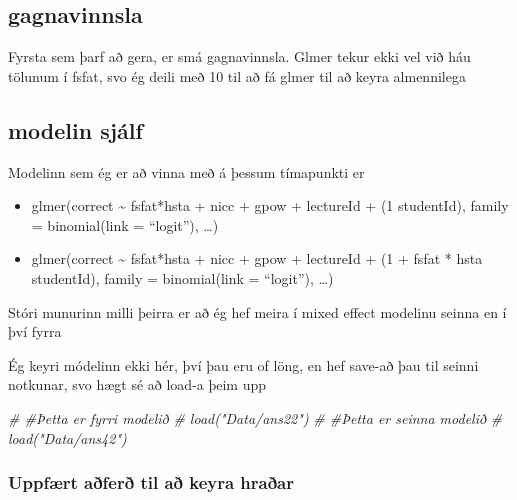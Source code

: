 \documentclass[
]{article}
\newenvironment{Shaded}{\begin{snugshade}}{\end{snugshade}}
\newcommand{\CommentTok}[1]{\textcolor[rgb]{0.56,0.35,0.01}{\textit{#1}}}
\newcommand{\DecValTok}[1]{\textcolor[rgb]{0.00,0.00,0.81}{#1}}
\newcommand{\NormalTok}[1]{#1}
\newcommand{\OperatorTok}[1]{\textcolor[rgb]{0.81,0.36,0.00}{\textbf{#1}}}
\newcommand{\StringTok}[1]{\textcolor[rgb]{0.31,0.60,0.02}{#1}}
\begin{document}
\hypertarget{gagnavinnsla}{%
\subsection{gagnavinnsla}\label{gagnavinnsla}}

Fyrsta sem þarf að gera, er smá gagnavinnsla. Glmer tekur ekki vel við háu tölunum í fsfat, svo ég deili með 10 til að fá glmer til að keyra almennilega

\begin{Shaded}
\end{Shaded}

\hypertarget{modelin-sjuxe1lf}{%
\subsection{modelin sjálf}\label{modelin-sjuxe1lf}}

Modelinn sem ég er að vinna með á þessum tímapunkti er

\begin{itemize}
\item
  glmer(correct \textasciitilde{} fsfat*hsta + nicc + gpow + lectureId + (1 \textbar{} studentId), family = binomial(link = ``logit''), \ldots)
\item
  glmer(correct \textasciitilde{} fsfat*hsta + nicc + gpow + lectureId + (1 + fsfat * hsta \textbar{} studentId), family = binomial(link = ``logit''), \ldots)
\end{itemize}

Stóri munurinn milli þeirra er að ég hef meira í mixed effect modelinu seinna en í því fyrra

Ég keyri módelinn ekki hér, því þau eru of löng, en hef save-að þau til seinni notkunar, svo hægt sé að load-a þeim upp

\begin{Shaded}
\begin{Highlighting}[]
\CommentTok{# #Þetta er fyrri modelið}
\CommentTok{# load("Data/ans22")}
\CommentTok{# #Þetta er seinna modelið}
\CommentTok{# load("Data/ans42")}
\end{Highlighting}
\end{Shaded}

\hypertarget{uppfuxe6rt-auxf0feruxf0-til-auxf0-keyra-hrauxf0ar}{%
\subsubsection{Uppfært aðferð til að keyra hraðar}\label{uppfuxe6rt-auxf0feruxf0-til-auxf0-keyra-hrauxf0ar}}
\end{document}
